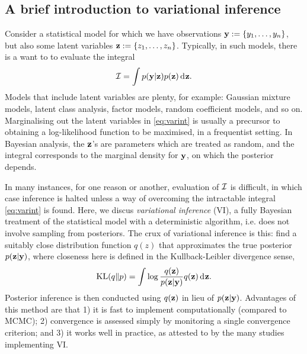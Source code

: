 \subsection{A brief introduction to variational inference}
\label{sec:varintro}

Consider a statistical model for which we have observations ${\mathbf y} := \{y_1,\dots,y_n\}$, but also some latent variables ${\mathbf z} := \{z_1,\dots,z_n\}$.
Typically, in such models, there is a want to to evaluate the integral 
\begin{equation}\label{eq:varint}
  {\mathcal I} = \int p({\mathbf y}|{\mathbf z}) p({\mathbf z}) \operatorname{d}\hspace{0.5pt}\! {\mathbf z}.
\end{equation}
Models that include latent variables are plenty, for example: Gaussian mixture models, latent class analysis, factor models, random coefficient models, and so on.
Marginalising out the latent variables in \cref{eq:varint} is usually a precursor to obtaining a log-likelihood function to be maximised, in a frequentist setting.
In Bayesian analysis, the ${\mathbf z}$'s are parameters which are treated as random, and the integral corresponds to the marginal density for ${\mathbf y}$, on which the posterior depends.

In many instances, for one reason or another, evaluation of ${\mathcal I}$ is difficult, in which case inference is halted unless a way of overcoming the intractable integral \cref{eq:varint} is found.
Here, we discus \emph{variational inference} (VI), a fully Bayesian treatment of the statistical model with a deterministic algorithm, i.e. does not involve sampling from posteriors.
The crux of variational inference is this: find a suitably close distribution function $q(z)$ that approximates the true posterior $p({\mathbf z}|{\mathbf y})$, where closeness here is defined in the Kullback-Leibler divergence sense,
\[
  \operatorname{KL}(q\Vert p) = \int \log \frac{q({\mathbf z})}{p({\mathbf z}|{\mathbf y})} q({\mathbf z}) \operatorname{d}\hspace{0.5pt}\! {\mathbf z}.
\]
Posterior inference is then conducted using $q({\mathbf z})$ in lieu of $p({\mathbf z}|{\mathbf y})$.
Advantages of this method are that 1) it is fast to implement computationally (compared to MCMC); 2) convergence is assessed simply by monitoring a single convergence criterion; and 3) it works well in practice, as attested to by the many studies implementing VI.

